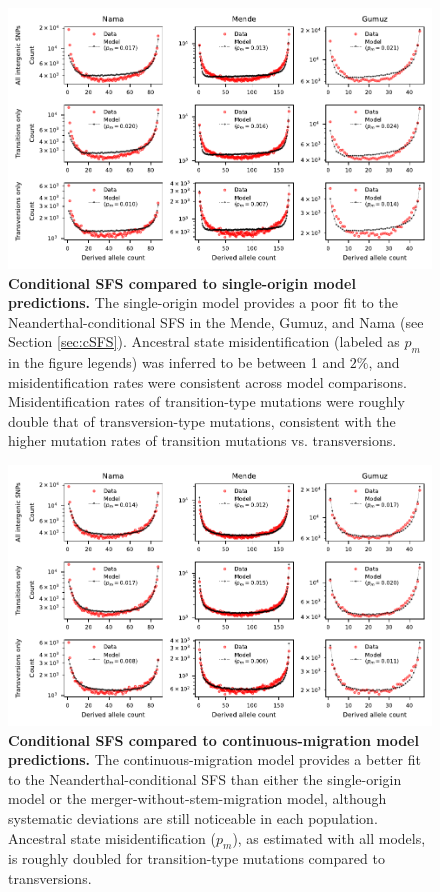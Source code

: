 \documentclass[]{article}
\begin{document}
\begin{figure}[ht]
    \centering
    \includegraphics{figures/supp-csfs-single-origin.pdf}
    \caption{
        \textbf{Conditional SFS compared to single-origin model predictions.}
        The single-origin model provides a poor fit to the Neanderthal-conditional SFS in
        the Mende, Gumuz, and Nama (see Section \ref{sec:cSFS}). Ancestral state misidentification
        (labeled as $p_m$ in the figure legends) was
        inferred to be between 1 and $2\%$, and misidentification rates were
        consistent across model comparisons. Misidentification rates of
        transition-type mutations were roughly double that of transversion-type
        mutations, consistent with the higher mutation rates of transition
        mutations vs. transversions.
    }
    \label{fig:supp-csfs-single-origin}
\end{figure}

\begin{figure}[ht]
    \centering
    \includegraphics{figures/supp-csfs-continuous-migration.pdf}
    \caption{
        \textbf{Conditional SFS compared to continuous-migration model predictions.}
        The continuous-migration model provides a better fit to the
        Neanderthal-conditional SFS than
        either the single-origin model or the merger-without-stem-migration
        model, although systematic deviations are still noticeable in each
        population. Ancestral state misidentification ($p_m$), as estimated
        with all models, is roughly doubled for transition-type mutations
        compared to transversions.
    }
    \label{fig:supp-csfs-continuous-migration}
\end{figure}
\end{document}
